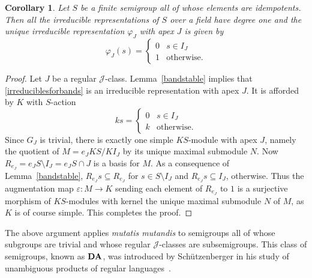 \documentclass[reqno,11pt]{amsart}
\def\pv#1{\ensuremath{{\bf#1}}}
\def\p{\varphi}
\def\J{\mathrel{{\mathscr J}}} %
\def\to{\rightarrow}
\newtheorem{Cor}[Thm]{Corollary}
\numberwithin{equation}{section}
\begin{document}
\begin{Cor}
Let $S$ be a finite semigroup all of whose elements are idempotents.
Then all the irreducible representations of $S$ over a field have
degree one and the unique irreducible representation $\p_J$ with apex
$J$ is given by
\begin{equation}\label{irreduciblesforbands}
\p_J(s) = \begin{cases} 0 & s\in I_J\\
1 & \text{otherwise.}
\end{cases}
\end{equation}
\end{Cor}
\begin{proof}
Let $J$ be a regular $\J$-class.  Lemma~\ref{bandstable} implies that
\eqref{irreduciblesforbands} is an irreducible representation with
apex $J$. It is afforded by $K$ with $S$-action \[ks 
= \begin{cases} 0 & s\in I_J\\ k & \text{otherwise.}\end{cases}\] 
Since $G_J$ is trivial, there is exactly one simple $KS$-module with
apex $J$, namely the quotient of 
$M=e_JKS/KI_J$ by its unique maximal submodule $N$.  Now
$R_{e_J}=e_JS\setminus I_J = e_JS\cap J$ is a basis for $M$.  As a
consequence of
Lemma~\ref{bandstable}, $R_{e_J}s \subseteq R_{e_J}$ for $s\in
S\setminus I_J$ and $R_{e_J}s\subseteq I_J$, otherwise.  Thus the
augmentation map $\varepsilon:M\to K$ 
  sending each element of $R_{e_J}$ to $1$ is a surjective morphism of
  $KS$-modules with kernel the unique maximal submodule $N$ of $M$, as
  $K$ is of course simple.  This completes the proof.
\end{proof}

The above argument applies {\it mutatis mutandis} to semigroups all of whose
subgroups are trivial and whose regular $\J$-classes are
subsemigroups.  This class of semigroups, known as $\pv {DA}$, was
introduced by Sch\"utzenberger in his study of unambiguous products of
regular languages~\cite{Schutznonambig}.





\end{document}
